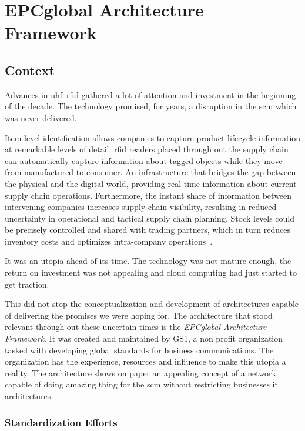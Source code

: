 \chapter{EPCglobal Architecture Framework} \label{sec:epcglobal}

\section{Context}

Advances in \acs{uhf}~\acs{rfid} gathered a lot of attention and investment in the beginning of the decade. The technology promised, for years, a disruption in the \ac{scm} which was never delivered. 

Item level identification allows companies to capture product lifecycle information at remarkable levels of detail. \ac{rfid} readers placed through out the supply chain can automatically capture information about tagged objects while they move from manufactured to consumer.
An infrastructure that bridges the gap between the physical and the digital world, providing real-time information about current supply chain operations.
Furthermore, the instant share of information between intervening companies increases supply chain visibility, resulting in reduced uncertainty in operational and tactical supply chain planning.
Stock levels could be precisely controlled and shared with trading partners, which in turn reduces inventory costs and optimizes intra-company operations~\cite{lorenzDiscoveryServicesEPC2011, simchi-leviCadeiasSuprimentosProjeto2003}.

It was an utopia ahead of its time. The technology was not mature enough, the return on investment was not appealing and cloud computing had just started to get traction.

This did not stop the conceptualization and development of architectures capable of delivering the promises we were hoping for.
The architecture that stood relevant through out these uncertain times is the \emph{EPCglobal Architecture Framework}.
It was created and maintained by GS1, a non profit organization tasked with developing global standards for business communications.
The organization has the experience, resources and influence to make this utopia a reality.
The architecture shows on paper an appealing concept of a network capable of doing amazing thing for the \ac{scm} without restricting businesses \ac{it} architectures.

\subsection{Standardization Efforts}

